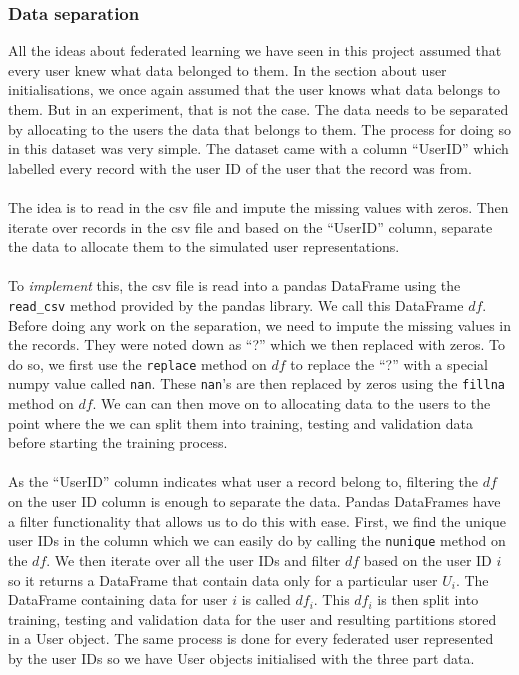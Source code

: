 \documentclass[12pt]{article}
\begin{document}
\subsubsection{Data separation}
All the ideas about federated learning we have seen in this project assumed that every user knew what data belonged to them. In the section about user initialisations, we once again assumed that the user knows what data belongs to them. But in an experiment, that is not the case. The data needs to be separated by allocating to the users the data that belongs to them. The process for doing so in this dataset was very simple. The dataset came with a column ``UserID'' which labelled every record with the user ID of the user that the record was from. 
\\\\
The idea is to read in the csv file and impute the missing values with zeros. Then iterate over records in the csv file and based on the ``UserID'' column, separate the data to allocate them to the simulated user representations. 
\\\\
To \textit{implement} this, the csv file is read into a pandas DataFrame using the \texttt{read\_csv} method provided by the pandas library. We call this DataFrame $df$. Before doing any work on the separation, we need to impute the missing values in the records. They were noted down as ``?'' which we then replaced with zeros. To do so, we first use the \texttt{replace} method on $df$ to replace the ``?'' with a special numpy value called \texttt{nan}. These \texttt{nan}'s are then replaced by zeros using the \texttt{fillna} method on $df$. We can can then move on to allocating data to the users to the point where the we can split them into training, testing and validation data before starting the training process.
\\\\
As the ``UserID'' column indicates what user a record belong to, filtering the $df$ on the user ID column is enough to separate the data. Pandas DataFrames have a filter functionality that allows us to do this with ease. First, we find the unique user IDs in the column which we can easily do by calling the \texttt{nunique} method on the $df$. We then iterate over all the user IDs and filter $df$ based on the user ID $i$ so it returns a DataFrame that contain data only for a particular user $U_i$. The DataFrame containing data for user $i$ is called $df_i$. This $df_i$ is then split into training, testing and validation data for the user and resulting partitions stored in a User object. The same process is done for every federated user represented by the user IDs so we have User objects initialised with the three part data. 
\end{document}
